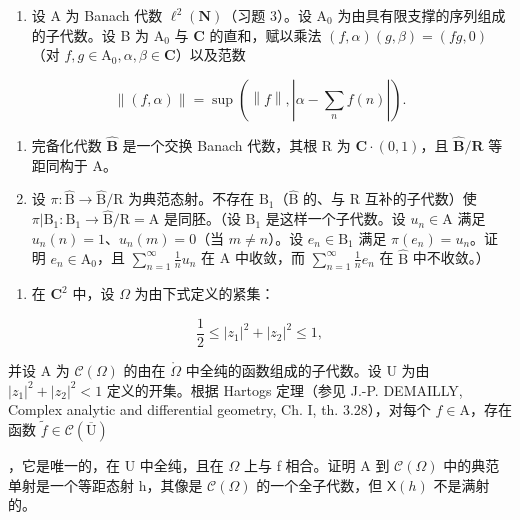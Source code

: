 \begin{enumerate}
\def\labelenumi{¶ \arabic{enumi})}
\setcounter{enumi}{12}
\tightlist
\item
  设 A 为 Banach 代数 \(\ell^{2}(\mathbf{N})\)（习题 3）。设 \(\mathrm{A}_{0}\) 为由具有限支撑的序列组成的子代数。设 B 为 \(\mathrm{A}_{0}\) 与 \(\mathbf{C}\) 的直和，赋以乘法 \((f,\alpha)(g,\beta)=(fg,0)\)（对 \(f,g\in\mathrm{A}_{0},\alpha,\beta\in\mathbf{C}\)）以及范数
\end{enumerate}

\[
\left\| (f, \alpha) \right\| = \sup \left(\left\| f \right\|, \left| \alpha - \sum_ {n} f (n) \right|\right).
\]

\begin{enumerate}
\def\labelenumi{\alph{enumi})}
\item
  完备化代数 \(\widehat{\mathbf{B}}\) 是一个交换 Banach 代数，其根 R 为 \(\mathbf{C} \cdot (0,1)\)，且 \(\widehat{\mathbf{B}}/\mathbf{R}\) 等距同构于 A。
\item
  设 \(\pi\colon\widehat{\mathrm{B}}\to\widehat{\mathrm{B}}/\mathrm{R}\) 为典范态射。不存在 \(\mathrm{B}_{1}\)（\(\widehat{\mathrm{B}}\) 的、与 R 互补的子代数）使 \(\pi|\mathrm{B}_{1}\colon\mathrm{B}_{1}\to\widehat{\mathrm{B}}/\mathrm{R}=\mathrm{A}\) 是同胚。（设 \(\mathrm{B}_{1}\) 是这样一个子代数。设 \(u_{n}\in\mathrm{A}\) 满足 \(u_{n}(n)=1\)、\(u_{n}(m)=0\)（当 \(m\neq n\)）。设 \(e_{n}\in\mathrm{B}_{1}\) 满足 \(\pi(e_{n})=u_{n}\)。证明 \(e_{n}\in\mathrm{A}_{0}\)，且 \(\sum_{n=1}^{\infty}\frac{1}{n}u_{n}\) 在 A 中收敛，而 \(\sum_{n=1}^{\infty}\frac{1}{n}e_{n}\) 在 \(\widehat{\mathrm{B}}\) 中不收敛。）
\end{enumerate}

\begin{enumerate}
\def\labelenumi{\arabic{enumi})}
\setcounter{enumi}{13}
\tightlist
\item
  在 \(\mathbf{C}^2\) 中，设 \(\Omega\) 为由下式定义的紧集：
\end{enumerate}

\[
\frac {1}{2} \leqslant | z _ {1} | ^ {2} + | z _ {2} | ^ {2} \leqslant 1,
\]

并设 A 为 \(\mathcal{C}(\Omega)\) 的由在 \(\mathring{\Omega}\) 中全纯的函数组成的子代数。设 U 为由 \(|z_1|^2 + |z_2|^2 < 1\) 定义的开集。根据 Hartogs 定理（参见 J.-P. DEMAILLY, Complex analytic and differential geometry, Ch. I, th. 3.28），对每个 \(f \in \mathrm{A}\)，存在函数 \(\widetilde{f} \in \mathcal{C}(\overline{\mathrm{U}})\)

，它是唯一的，在 U 中全纯，且在 \(\Omega\) 上与 f 相合。证明 A 到 \(\mathcal{C}(\Omega)\) 中的典范单射是一个等距态射 h，其像是 \(\mathcal{C}(\Omega)\) 的一个全子代数，但 \(\mathsf{X}(h)\) 不是满射的。


